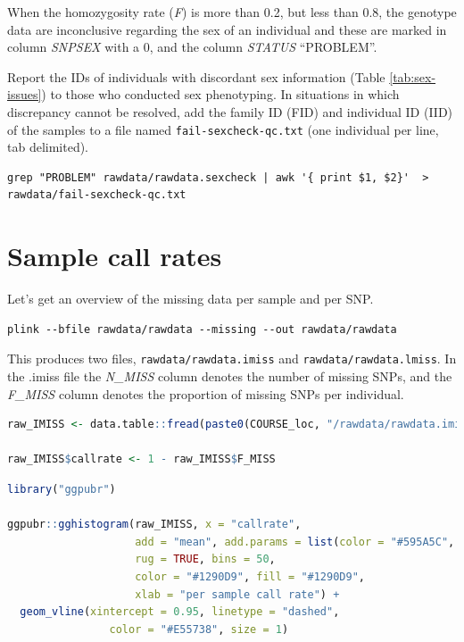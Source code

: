 \documentclass[
]{book}
\newcommand{\passthrough}[1]{#1}
\begin{document}
When the homozygosity rate (\emph{F}) is more than 0.2, but less than 0.8, the genotype data are inconclusive regarding the sex of an individual and these are marked in column \emph{SNPSEX} with a 0, and the column \emph{STATUS} ``PROBLEM''.

Report the IDs of individuals with discordant sex information (Table \ref{tab:sex-issues}) to those who conducted sex phenotyping. In situations in which discrepancy cannot be resolved, add the family ID (FID) and individual ID (IID) of the samples to a file named \passthrough{\lstinline!fail-sexcheck-qc.txt!} (one individual per line, tab delimited).

\begin{lstlisting}
grep "PROBLEM" rawdata/rawdata.sexcheck | awk '{ print $1, $2}'  > rawdata/fail-sexcheck-qc.txt
\end{lstlisting}

\hypertarget{sample-call-rates}{%
\section{Sample call rates}\label{sample-call-rates}}

Let's get an overview of the missing data per sample and per SNP.

\begin{lstlisting}
plink --bfile rawdata/rawdata --missing --out rawdata/rawdata
\end{lstlisting}

This produces two files, \passthrough{\lstinline!rawdata/rawdata.imiss!} and \passthrough{\lstinline!rawdata/rawdata.lmiss!}. In the .imiss file the \emph{N\_MISS} column denotes the number of missing SNPs, and the \emph{F\_MISS} column denotes the proportion of missing SNPs per individual.

\begin{lstlisting}[language=R]
raw_IMISS <- data.table::fread(paste0(COURSE_loc, "/rawdata/rawdata.imiss"))

raw_IMISS$callrate <- 1 - raw_IMISS$F_MISS
\end{lstlisting}

\begin{lstlisting}[language=R]
library("ggpubr")

ggpubr::gghistogram(raw_IMISS, x = "callrate",
                    add = "mean", add.params = list(color = "#595A5C", linetype = "dashed", size = 1),
                    rug = TRUE, bins = 50,
                    color = "#1290D9", fill = "#1290D9",
                    xlab = "per sample call rate") +
  geom_vline(xintercept = 0.95, linetype = "dashed",
                color = "#E55738", size = 1)
\end{lstlisting}
\end{document}
